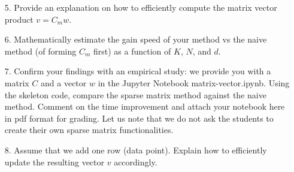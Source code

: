 \documentclass[11pt]{article}
\begin{document}
\begin{enumerate}
    \item[5.] Provide an explanation on how to efficiently compute the matrix vector product $v = C_m w$.

    \item[6.] Mathematically estimate the gain speed of your method vs the naive method (of forming $C_m$ first) as a function of $K$, $N$, and $d$.

    \item[7.] Confirm your findings with an empirical study: we provide you with a matrix $C$ and a vector $w$ in the Jupyter Notebook matrix-vector.ipynb. Using the skeleton code, compare the sparse matrix method against the naive method. Comment on the time improvement and attach your notebook here in pdf format for grading. Let us note that we do not ask the students to create their own sparse matrix functionalities.

    \item[8.] Assume that we add one row (data point). Explain how to efficiently update the resulting vector $v$ accordingly.
\end{enumerate}
\end{document}
